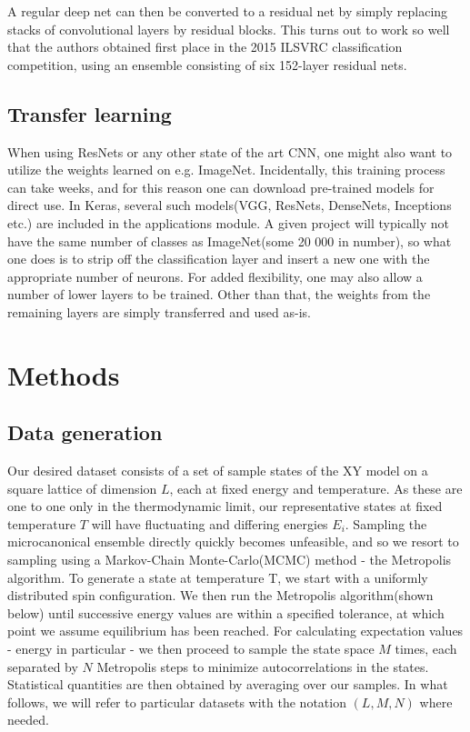 \documentclass[]{article}
\begin{document}
A regular deep net can then be converted to a residual net by simply replacing stacks of convolutional layers by residual blocks. This turns out to work so well that the authors obtained first place in the 2015 ILSVRC classification competition, using an ensemble consisting of six 152-layer residual nets. 

\subsection{Transfer learning}
When using ResNets or any other state of the art CNN, one might also want to utilize the weights learned on e.g. ImageNet. Incidentally, this training process can take weeks, and for this reason one can download pre-trained models for direct use. In Keras, several such models(VGG, ResNets, DenseNets, Inceptions etc.) are included in the applications module. A given project will typically not have the same number of classes as ImageNet(some 20 000 in number), so what one does is to strip off the classification layer and insert a new one with the appropriate number of neurons. For added flexibility, one may also allow a number of lower layers to be trained. Other than that, the weights from the remaining layers are simply transferred and used as-is. 

\section{Methods}

\subsection{Data generation}
Our desired dataset consists of a set of sample states of the XY model on a square lattice of dimension $L$, each at fixed energy and temperature. As these are one to one only in the thermodynamic limit, our representative states at fixed temperature $T$ will have fluctuating and differing energies $E_i$. Sampling the microcanonical ensemble directly quickly becomes unfeasible, and so we resort to sampling using a Markov-Chain Monte-Carlo(MCMC) method - the Metropolis algorithm. To generate a state at temperature T, we start with a uniformly distributed spin configuration. We then run the Metropolis algorithm(shown below) until successive energy values are within a specified tolerance, at which point we assume equilibrium has been reached. For calculating expectation values - energy in particular - we then proceed to sample the state space $M$ times, each separated by $N$ Metropolis steps to minimize autocorrelations in the states. Statistical quantities are then obtained by averaging over our samples. In what follows, we will refer to particular datasets with the notation $(L,M,N)$ where needed.
\end{document}
